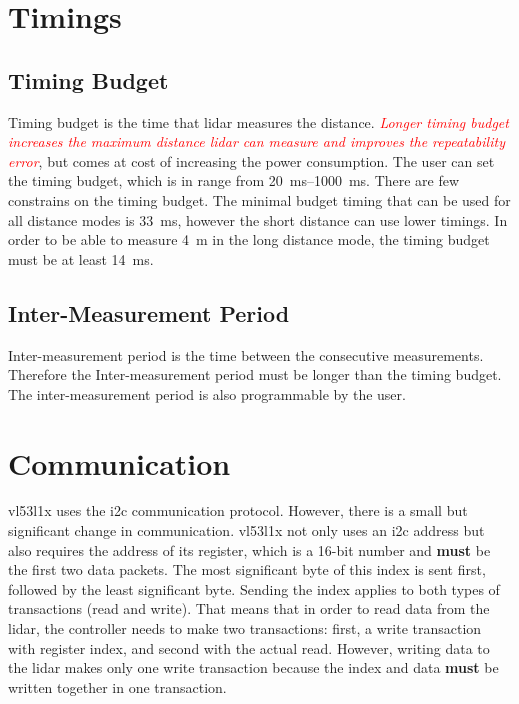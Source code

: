 \documentclass[
  digital,     %
  oneside,     %
  nosansbold,  %
  nocolorbold, %
  lof,         %
  lot,         %
]{fithesis4}
\newcommand{\TODO}[1]{\textcolor{red}{\textit{#1}}}
\begin{document}
\section{ Timings }


\subsection{ Timing Budget } \label{TB}

Timing budget is the time that \acrshort{lidar} measures the distance. \TODO{ Longer timing budget increases the maximum distance \acrshort{lidar} can measure and improves the repeatability error}, but comes at cost of increasing the power consumption. The user can set the timing budget, which is in range from \qtyrange{20}{1000}{\milli\second}. There are few constrains on the timing budget. The minimal budget timing that can be used for all distance modes is \qty{33}{\milli\second}, however the short distance can use lower timings. In order to be able to measure \qty{4}{\metre} in the long distance mode, the timing budget must be at least \qty{14}{\milli\second}.

\subsection{ Inter-Measurement Period }
Inter-measurement period is the time between the consecutive measurements. Therefore the Inter-measurement period must be longer than the timing budget. The inter-measurement period is also programmable by the user.

\section{ Communication }
\gls{vl53l1x} uses the \acrshort{i2c} communication protocol. However, there is a small but significant change in communication. \gls{vl53l1x} not only uses an \acrshort{i2c} address but also requires the address of its register, which is a 16-bit number and \textbf{must} be the first two data packets. The most significant byte of this index is sent first, followed by the least significant byte. Sending the index applies to both types of transactions (read and write). That means that in order to read data from the \acrshort{lidar}, the controller needs to make two transactions: first, a write transaction with register index, and second with the actual read. However, writing data to the \acrshort{lidar} makes only one write transaction because the index and data \textbf{must} be written together in one transaction.
\end{document}
